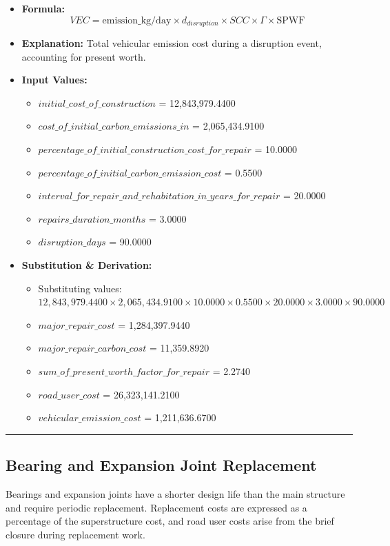 \documentclass[12pt,a4paper]{article}
\begin{document}
\begin{itemize}
  \item \textbf{Formula:} $$VEC = \text{emission\_kg/day} \times d_{disruption} \times SCC \times \Gamma \times \text{SPWF}$$
  \item \textbf{Explanation:} Total vehicular emission cost during a disruption event, accounting for present worth.
  \item \textbf{Input Values:}
  \begin{itemize}
    \item $initial\_cost\_of\_construction$ = 12,843,979.4400
    \item $cost\_of\_initial\_carbon\_emissions\_in$ = 2,065,434.9100
    \item $percentage\_of\_initial\_construction\_cost\_for\_repair$ = 10.0000
    \item $percentage\_of\_initial\_carbon\_emission\_cost$ = 0.5500
    \item $interval\_for\_repair\_and\_rehabitation\_in\_years\_for\_repair$ = 20.0000
    \item $repairs\_duration\_months$ = 3.0000
    \item $disruption\_days$ = 90.0000
  \end{itemize}
  \item \textbf{Substitution \& Derivation:}
  \begin{itemize}
    \item Substituting values: $12,843,979.4400 \times 2,065,434.9100 \times 10.0000 \times 0.5500 \times 20.0000 \times 3.0000 \times 90.0000$
    \item $major\_repair\_cost$ = 1,284,397.9440
    \item $major\_repair\_carbon\_cost$ = 11,359.8920
    \item $sum\_of\_present\_worth\_factor\_for\_repair$ = 2.2740
    \item $road\_user\_cost$ = 26,323,141.2100
    \item $vehicular\_emission\_cost$ = 1,211,636.6700
  \end{itemize}
\end{itemize}


\medskip\hrule\medskip


\subsection{Bearing and Expansion Joint Replacement}

Bearings and expansion joints have a shorter design life than the main structure and require periodic replacement. Replacement costs are expressed as a percentage of the superstructure cost, and road user costs arise from the brief closure during replacement work.
\end{document}
